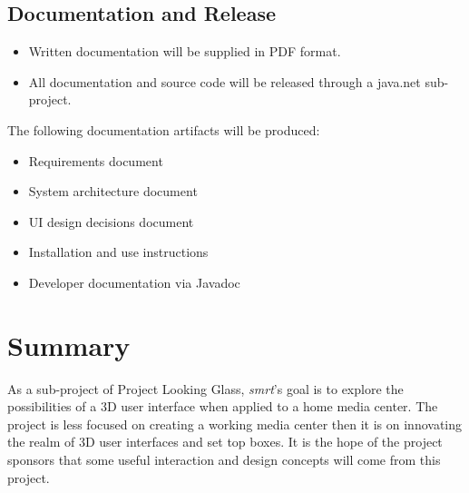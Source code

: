 \documentclass[letterpaper, titlepage, 11pt]{article}
\begin{document}
\subsection{Documentation and Release}
\begin{itemize}
\item Written documentation will be supplied in PDF format.
\item All documentation and source code will be released through a java.net sub-project.
\end{itemize}

\begin{flushleft}
The following documentation artifacts will be produced:
\end{flushleft}

\begin{itemize}
\item Requirements document
\item System architecture document
\item UI design decisions document
\item Installation and use instructions
\item Developer documentation via Javadoc
\end{itemize}

\section{Summary}
As a sub-project of Project Looking Glass, \textit{smrt}'s goal is to explore the
possibilities of a 3D user interface when applied to a home media center. The project
is less focused on creating a working media center then it is on innovating the realm
of 3D user interfaces and set top boxes. It is the hope of the project sponsors that
some useful interaction and design concepts will come from this project.
\end{document}
